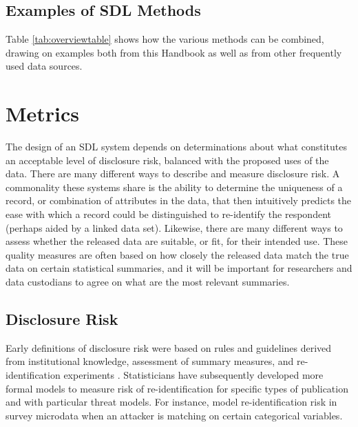 \hypertarget{examples-of-sdl-methods}{%
\subsection{Examples of SDL Methods}\label{examples-of-sdl-methods}}

Table \ref{tab:overviewtable} shows how the various methods can be combined, drawing on examples both from this Handbook as well as from other frequently used data sources.



\hypertarget{metrics}{%
\section{Metrics}\label{metrics}}

The design of an SDL system depends on determinations about what constitutes an acceptable level of disclosure risk, balanced with the proposed uses of the data. There are many different ways to describe and measure disclosure risk. A commonality these systems share is the ability to determine the uniqueness of a record, or combination of attributes in the data, that then intuitively predicts the ease with which a record could be distinguished to re-identify the respondent (perhaps aided by a linked data set). Likewise, there are many different ways to assess whether the released data are suitable, or fit, for their intended use. These quality measures are often based on how closely the released data match the true data on certain statistical summaries, and it will be important for researchers and data custodians to agree on what are the most relevant summaries.

\hypertarget{disclosure-risk}{%
\subsection{Disclosure Risk}\label{disclosure-risk}}

Early definitions of disclosure risk were based on rules and guidelines derived from institutional knowledge, assessment of summary measures, and re-identification experiments \citep{harris-kojetin_statistical_2005}. Statisticians have subsequently developed more formal models to measure risk of re-identification for specific types of publication and with particular threat models. For instance, \citet{shlomo_assessing_2010} model re-identification risk in survey microdata when an attacker is matching on certain categorical variables.

